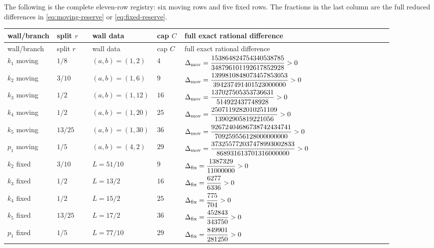 \documentclass[11pt]{article}
\theoremstyle{remark}
\begin{document}
The following is the complete eleven-row registry: six moving rows and
five fixed rows.  The fractions in the last column are the full reduced
differences in \eqref{eq:moving-reserve} or \eqref{eq:fixed-reserve}.

\begingroup
\scriptsize
\renewcommand{\arraystretch}{1.25}
\begin{longtable}{@{}>{\raggedright\arraybackslash}p{0.09\linewidth}
 >{\centering\arraybackslash}p{0.09\linewidth}
 >{\centering\arraybackslash}p{0.115\linewidth}
 >{\centering\arraybackslash}p{0.07\linewidth}
 >{\raggedright\arraybackslash}p{0.53\linewidth}@{}}
\toprule
wall/branch & split $r$ & wall data & cap $C$ & full exact rational difference\\
\midrule
\endfirsthead
\toprule
wall/branch & split $r$ & wall data & cap $C$ & full exact rational difference\\
\midrule
\endhead
$k_1$ moving & $1/8$ & $(a,b)=(1,2)$ & $4$ &
$\displaystyle\Delta_{\rm mov}=
\frac{153864824754340538785}{348796101192617852928}>0$\\
$k_2$ moving & $3/10$ & $(a,b)=(1,6)$ & $9$ &
$\displaystyle\Delta_{\rm mov}=
\frac{1399810848073457853053}{394237491401523000000}>0$\\
$k_3$ moving & $1/2$ & $(a,b)=(1,12)$ & $16$ &
$\displaystyle\Delta_{\rm mov}=
\frac{137027505353736631}{514922437748928}>0$\\
$k_4$ moving & $1/2$ & $(a,b)=(1,20)$ & $25$ &
$\displaystyle\Delta_{\rm mov}=
\frac{2507119282010251109}{13902905819221056}>0$\\
$k_5$ moving & $13/25$ & $(a,b)=(1,30)$ & $36$ &
$\displaystyle\Delta_{\rm mov}=
\frac{92672404686738742434741}{709259556128000000000}>0$\\
$p_1$ moving & $1/5$ & $(a,b)=(4,2)$ & $29$ &
$\displaystyle\Delta_{\rm mov}=
\frac{373255772037478993002833}{868931613701316000000}>0$\\
\midrule
$k_2$ fixed & $3/10$ & $L=51/10$ & $9$ &
$\displaystyle\Delta_{\rm fix}=\frac{1387329}{11000000}>0$\\
$k_3$ fixed & $1/2$ & $L=13/2$ & $16$ &
$\displaystyle\Delta_{\rm fix}=\frac{6277}{6336}>0$\\
$k_4$ fixed & $1/2$ & $L=15/2$ & $25$ &
$\displaystyle\Delta_{\rm fix}=\frac{775}{704}>0$\\
$k_5$ fixed & $13/25$ & $L=17/2$ & $36$ &
$\displaystyle\Delta_{\rm fix}=\frac{452843}{343750}>0$\\
$p_1$ fixed & $1/5$ & $L=77/10$ & $29$ &
$\displaystyle\Delta_{\rm fix}=\frac{849901}{281250}>0$\\
\bottomrule
\end{longtable}
\endgroup
\end{document}
